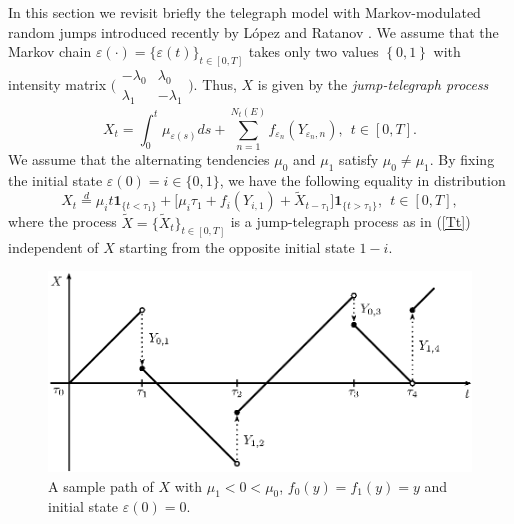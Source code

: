 \documentclass[11pt]{article}
\theoremstyle{plain}
\theoremstyle{definition}
\numberwithin{equation}{section}
\newcommand{\set}[1]{\left\{#1\right\}}
\newcommand{\eps}{\varepsilon}
\newcommand{\Fil}{\mathds{F}}
\begin{document}
In this section we revisit briefly the telegraph model with Markov-modulated random jumps introduced recently by L\'opez and Ratanov \cite{lopezrat}. We assume that the Markov chain $\eps(\cdot)=\{\eps(t)\}_{t\in[0,T]}$ takes only two values $\set{0,1}$ with intensity matrix $\bigl(\begin{smallmatrix}-\lambda_0 & \lambda_0\\ \lambda_1 &-\lambda_1\end{smallmatrix}\bigr).$ Thus, $X$ is given by the \emph{jump-telegraph process
}
\begin{equation}\label{Tt}
X_t=\int_0^t \mu_{\eps(s)}ds+\sum_{n=1}^{N_t(E)}f_{\eps_n}(Y_{\eps_n,n}), \ \ t\in [0,T].
\end{equation}
We assume that the alternating tendencies $\mu_0$ and $\mu_1$ satisfy $\mu_0\neq \mu_1.$ By fixing the initial state $\eps(0)=i\in\{0,1\}$, we have the following equality in distribution
\begin{equation}\label{eq:edZ}
X_t\overset{d}{=}\mu_i t\mathbf{1}_{\{t<\tau_1\}}+\bigl[\mu_i\tau_1+f_i(Y_{i,1})+\widetilde{X}_{t-\tau_1}\bigr]\mathbf{1}_{\{t>\tau_1\}}, \ \ t\in[0,T],
\end{equation}
where the process $\widetilde{X}=\{\widetilde{X}_t\}_{t\in[0,T]}$ is a jump-telegraph process as in (\ref{Tt}) independent of $X$  starting from the opposite initial state $1-i$.

\begin{figure}[htb]
\centering
\includegraphics{Figure1.eps}
\caption{\small A sample path of $X$ with $\mu_1<0<\mu_0$, $f_0(y)=f_1(y)=y$ and initial state $\eps(0)=0$.}
\end{figure}
\end{document}
